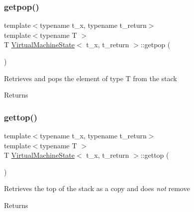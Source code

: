 \subsubsection{\texorpdfstring{getpop()}{getpop()}}
{\footnotesize\ttfamily template$<$typename t\+\_\+x, typename t\+\_\+return$>$ \\
template$<$typename T $>$ \\
T \hyperlink{class_virtual_machine_state}{Virtual\+Machine\+State}$<$ t\+\_\+x, t\+\_\+return $>$\+::getpop (\begin{DoxyParamCaption}{ }\end{DoxyParamCaption})\hspace{0.3cm}{\ttfamily [inline]}}

Retrieves and pops the element of type T from the stack \begin{DoxyReturn}{Returns}

\end{DoxyReturn}
\mbox{\label{class_virtual_machine_state_aa721c5fcd32593015f48c44af8edd594}} 
\subsubsection{\texorpdfstring{gettop()}{gettop()}}
{\footnotesize\ttfamily template$<$typename t\+\_\+x, typename t\+\_\+return$>$ \\
template$<$typename T $>$ \\
T \hyperlink{class_virtual_machine_state}{Virtual\+Machine\+State}$<$ t\+\_\+x, t\+\_\+return $>$\+::gettop (\begin{DoxyParamCaption}{ }\end{DoxyParamCaption})\hspace{0.3cm}{\ttfamily [inline]}}

Retrieves the top of the stack as a copy and does {\itshape not} remove \begin{DoxyReturn}{Returns}

\end{DoxyReturn}
\mbox{\label{class_virtual_machine_state_affbb1cc7171793735cbc4cdd94b987bb}} 
